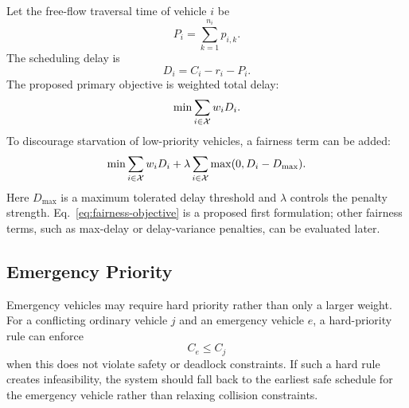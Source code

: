 Let the free-flow traversal time of vehicle $i$ be
\begin{equation}
    P_i = \sum_{k=1}^{n_i} p_{i,k}.
\end{equation}
The scheduling delay is
\begin{equation}
    D_i = C_i - r_i - P_i.
\end{equation}
The proposed primary objective is weighted total delay:
\begin{equation}
    \min \sum_{i\in\mathcal{X}} w_i D_i.
    \label{eq:weighted-delay}
\end{equation}
To discourage starvation of low-priority vehicles, a fairness term can be added:
\begin{equation}
    \min \sum_{i\in\mathcal{X}} w_i D_i
    + \lambda \sum_{i\in\mathcal{X}}\max(0,D_i-D_{\max}).
    \label{eq:fairness-objective}
\end{equation}
Here $D_{\max}$ is a maximum tolerated delay threshold and $\lambda$ controls the penalty strength. Eq.~\eqref{eq:fairness-objective} is a proposed first formulation; other fairness terms, such as max-delay or delay-variance penalties, can be evaluated later.

\subsection{Emergency Priority}

Emergency vehicles may require hard priority rather than only a larger weight. For a conflicting ordinary vehicle $j$ and an emergency vehicle $e$, a hard-priority rule can enforce
\begin{equation}
    C_e \le C_j
\end{equation}
when this does not violate safety or deadlock constraints. If such a hard rule creates infeasibility, the system should fall back to the earliest safe schedule for the emergency vehicle rather than relaxing collision constraints.

